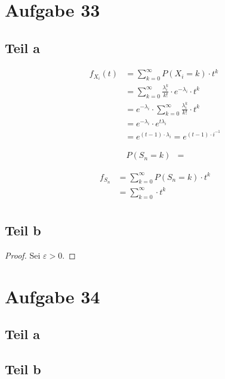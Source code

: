 \documentclass[10pt,a4paper]{article}
\begin{document}
\section{Aufgabe 33}

\subsection{Teil a}

\begin{align*}
  f_{X_{i}}(t) & = \sum_{k = 0}^{\infty} P(X_{i} = k) \cdot t^{k}\\
  & = \sum_{k = 0}^{\infty} \frac{\lambda_{i}^{k}}{k!} \cdot e^{-\lambda_{i}} \cdot t^{k}\\
  & = e^{-\lambda_{i}} \cdot \sum_{k = 0}^{\infty} \frac{\lambda_{i}^{k}}{k!} \cdot t^{k}\\
  & = e^{-\lambda_{i}} \cdot e^{t\lambda_{i}}\\
  & = e^{(t - 1) \cdot \lambda_{i}} = e^{(t - 1) \cdot i^{-1}}
\end{align*}

\begin{align*}
  P\left( S_{n} = k \right) & =
\end{align*}

\begin{align*}
  f_{S_{n}} & = \sum_{k = 0}^{\infty} P(S_{n} = k) \cdot t^{k}\\
  & = \sum_{k = 0}^{\infty}  \cdot t^{k}\\
\end{align*}

\subsection{Teil b}

\begin{proof}
  Sei $\varepsilon > 0$.
\end{proof}

\section{Aufgabe 34}

\subsection{Teil a}

\subsection{Teil b}
\end{document}
